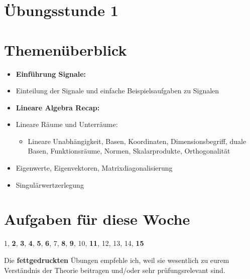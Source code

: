 \documentclass[11pt]{article}
\begin{document}
\thispagestyle{firstpage}

\setlength{\headheight}{1 \baselineskip}  %
\setlength{\parindent}{0pt}  %
\setlength{\parskip}{\baselineskip}  %

\vspace*{-5px}
\section*{Übungsstunde 1}

\section*{Themenüberblick}
\begin{itemize}
    \item \textbf{Einführung Signale:}
    \item[] Einteilung der Signale und einfache Beispielsaufgaben zu Signalen
    \item \textbf{Lineare Algebra Recap:}
    \item[] Lineare Räume und Unterräume: \begin{itemize}
        \item[] Lineare Unabhängigkeit, Basen, Koordinaten, Dimensionsbegriff, duale Basen, Funktionsräume, Normen, Skalarprodukte, Orthogonalität
    \end{itemize}
    \item[] Eigenwerte, Eigenvektoren, Matrixdiagonalisierung
    \item[] Singulärwertzerlegung
\end{itemize}

\section*{Aufgaben für diese Woche}
\vspace{-0.5cm}

1, \textbf{2}, \textbf{3}, \textbf{4}, \textbf{5}, \textbf{6}, 7, \textbf{8}, \textbf{9}, 10, \textbf{11}, 12, 13, 14, \textbf{15}\\
\vspace{-0.5cm}

Die \textbf{fettgedruckten} Übungen empfehle ich, weil sie wesentlich zu eurem Verständnis der Theorie beitragen und/oder sehr prüfungsrelevant sind.

\vfill \null
\pagebreak
\end{document}
